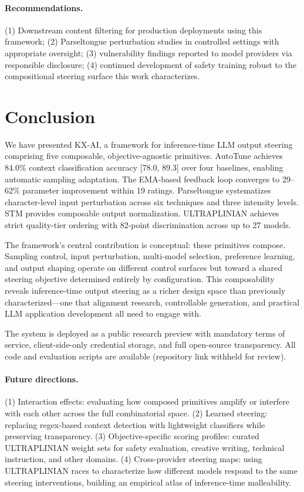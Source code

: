 \documentclass[11pt]{article}
\begin{document}
\paragraph{Recommendations.} (1) Downstream content filtering for production deployments using this framework; (2) Parseltongue perturbation studies in controlled settings with appropriate oversight; (3) vulnerability findings reported to model providers via responsible disclosure; (4) continued development of safety training robust to the compositional steering surface this work characterizes.

\section{Conclusion}

We have presented \textsc{KX-AI}, a framework for inference-time LLM output steering comprising five composable, objective-agnostic primitives. AutoTune achieves 84.0\% context classification accuracy [78.0, 89.3] over four baselines, enabling automatic sampling adaptation. The EMA-based feedback loop converges to 29--62\% parameter improvement within 19 ratings. Parseltongue systematizes character-level input perturbation across six techniques and three intensity levels. STM provides composable output normalization. ULTRAPLINIAN achieves strict quality-tier ordering with 82-point discrimination across up to 27 models.

The framework's central contribution is conceptual: these primitives compose. Sampling control, input perturbation, multi-model selection, preference learning, and output shaping operate on different control surfaces but toward a shared steering objective determined entirely by configuration. This composability reveals inference-time output steering as a richer design space than previously characterized---one that alignment research, controllable generation, and practical LLM application development all need to engage with.

The system is deployed as a public research preview with mandatory terms of service, client-side-only credential storage, and full open-source transparency. All code and evaluation scripts are available (repository link withheld for review).

\paragraph{Future directions.} (1) Interaction effects: evaluating how composed primitives amplify or interfere with each other across the full combinatorial space. (2) Learned steering: replacing regex-based context detection with lightweight classifiers while preserving transparency. (3) Objective-specific scoring profiles: curated ULTRAPLINIAN weight sets for safety evaluation, creative writing, technical instruction, and other domains. (4) Cross-provider steering maps: using ULTRAPLINIAN races to characterize how different models respond to the same steering interventions, building an empirical atlas of inference-time malleability.
\end{document}
